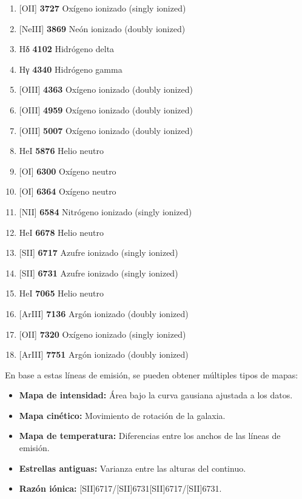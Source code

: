 \documentclass[10pt,twocolumn,a4paper]{opticajnl}
\begin{document}
\begin{enumerate}
  \item {[OII] \textbf{3727} Oxígeno ionizado (singly ionized)}
  \item {[NeIII] \textbf{3869} Neón ionizado (doubly ionized)}
  \item {Hδ \textbf{4102} Hidrógeno delta}
  \item {Hγ \textbf{4340} Hidrógeno gamma}
  \item {[OIII] \textbf{4363} Oxígeno ionizado (doubly ionized)}
  \item {[OIII] \textbf{4959} Oxígeno ionizado (doubly ionized)}
  \item {[OIII] \textbf{5007} Oxígeno ionizado (doubly ionized)}
  \item {HeI \textbf{5876} Helio neutro}
  \item {[OI] \textbf{6300} Oxígeno neutro}
  \item {[OI] \textbf{6364} Oxígeno neutro}
  \item {[NII] \textbf{6584} Nitrógeno ionizado (singly ionized)}
  \item {HeI \textbf{6678} Helio neutro}
  \item {[SII] \textbf{6717} Azufre ionizado (singly ionized)}
  \item {[SII] \textbf{6731} Azufre ionizado (singly ionized)}
  \item {HeI \textbf{7065} Helio neutro}
  \item {[ArIII] \textbf{7136} Argón ionizado (doubly ionized)}
  \item {[OII] \textbf{7320} Oxígeno ionizado (singly ionized)}
  \item {[ArIII] \textbf{7751} Argón ionizado (doubly ionized)}
\end{enumerate}

En base a estas líneas de emisión, se pueden obtener múltiples tipos de mapas:

\begin{itemize}
\item \textbf{Mapa de intensidad:} Área bajo la curva gausiana ajustada a los datos.
\item \textbf{Mapa cinético:} Movimiento de rotación de la galaxia.
\item \textbf{Mapa de temperatura:} Diferencias entre los anchos de las líneas de emisión.
\item \textbf{Estrellas antiguas:} Varianza entre las alturas del continuo.
\item \textbf{Razón iónica:} [SII]6717/[SII]6731[SII]6717/[SII]6731.
\end{itemize}
\end{document}
